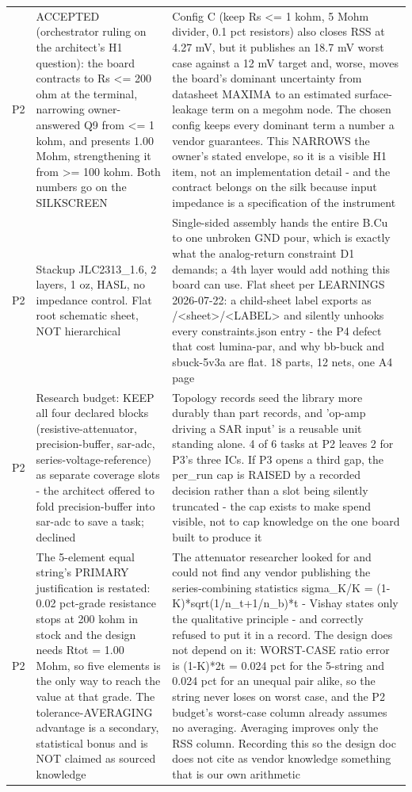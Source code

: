 \documentclass[11pt,a4paper]{article}
\begin{document}
{\begin{longtable}{lp{5.2cm}p{7.2cm}}
P2 & ACCEPTED (orchestrator ruling on the architect's H1 question): the board contracts to Rs \textless{}= 200 ohm at the terminal, narrowing owner-answered Q9 from \textless{}= 1 kohm, and presents 1.00 Mohm, strengthening it from \textgreater{}= 100 kohm. Both numbers go on the SILKSCREEN & Config C (keep Rs \textless{}= 1 kohm, 5 Mohm divider, 0.1 pct resistors) also closes RSS at 4.27 mV, but it publishes an 18.7 mV worst case against a 12 mV target and, worse, moves the board's dominant uncertainty from datasheet MAXIMA to an estimated surface-leakage term on a megohm node. The chosen config keeps every dominant term a number a vendor guarantees. This NARROWS the owner's stated envelope, so it is a visible H1 item, not an implementation detail - and the contract belongs on the silk because input impedance is a specification of the instrument \\
P2 & Stackup JLC2313\_1.6, 2 layers, 1 oz, HASL, no impedance control. Flat root schematic sheet, NOT hierarchical & Single-sided assembly hands the entire B.Cu to one unbroken GND pour, which is exactly what the analog-return constraint D1 demands; a 4th layer would add nothing this board can use. Flat sheet per LEARNINGS 2026-07-22: a child-sheet label exports as /\textless{}sheet\textgreater{}/\textless{}LABEL\textgreater{} and silently unhooks every constraints.json entry - the P4 defect that cost lumina-par, and why bb-buck and sbuck-5v3a are flat. 18 parts, 12 nets, one A4 page \\
P2 & Research budget: KEEP all four declared blocks (resistive-attenuator, precision-buffer, sar-adc, series-voltage-reference) as separate coverage slots - the architect offered to fold precision-buffer into sar-adc to save a task; declined & Topology records seed the library more durably than part records, and 'op-amp driving a SAR input' is a reusable unit standing alone. 4 of 6 tasks at P2 leaves 2 for P3's three ICs. If P3 opens a third gap, the per\_run cap is RAISED by a recorded decision rather than a slot being silently truncated - the cap exists to make spend visible, not to cap knowledge on the one board built to produce it \\
P2 & The 5-element equal string's PRIMARY justification is restated: 0.02 pct-grade resistance stops at 200 kohm in stock and the design needs Rtot = 1.00 Mohm, so five elements is the only way to reach the value at that grade. The tolerance-AVERAGING advantage is a secondary, statistical bonus and is NOT claimed as sourced knowledge & The attenuator researcher looked for and could not find any vendor publishing the series-combining statistics sigma\_K/K = (1-K){*}sqrt(1/n\_t+1/n\_b){*}t - Vishay states only the qualitative principle - and correctly refused to put it in a record. The design does not depend on it: WORST-CASE ratio error is (1-K){*}2t = 0.024 pct for the 5-string and 0.024 pct for an unequal pair alike, so the string never loses on worst case, and the P2 budget's worst-case column already assumes no averaging. Averaging improves only the RSS column. Recording this so the design doc does not cite as vendor knowledge something that is our own arithmetic \\

\end{longtable}}
\end{document}
